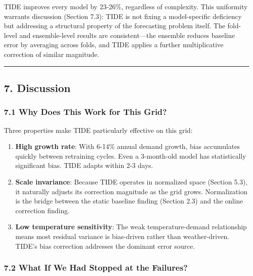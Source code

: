 TIDE improves every model by 23-26\%, regardless of complexity. This
uniformity warrants discussion (Section 7.3): TIDE is not fixing a
model-specific deficiency but addressing a structural property of the
forecasting problem itself. The fold-level and ensemble-level results
are consistent---the ensemble reduces baseline error by averaging across
folds, and TIDE applies a further multiplicative correction of similar
magnitude.

\begin{center}\rule{0.5\linewidth}{0.5pt}\end{center}

\subsection{7. Discussion}\label{discussion}

\subsubsection{7.1 Why Does This Work for This
Grid?}\label{why-does-this-work-for-this-grid}

Three properties make TIDE particularly effective on this grid:

\begin{enumerate}
\def\labelenumi{\arabic{enumi}.}
\item
  \textbf{High growth rate}: With 6-14\% annual demand growth, bias
  accumulates quickly between retraining cycles. Even a 3-month-old
  model has statistically significant bias. TIDE adapts within 2-3 days.
\item
  \textbf{Scale invariance}: Because TIDE operates in normalized space
  (Section 5.3), it naturally adjusts its correction magnitude as the
  grid grows. Normalization is the bridge between the static baseline
  finding (Section 2.3) and the online correction finding.
\item
  \textbf{Low temperature sensitivity}: The weak temperature-demand
  relationship means most residual variance is bias-driven rather than
  weather-driven. TIDE's bias correction addresses the dominant error
  source.
\end{enumerate}

\subsubsection{7.2 What If We Had Stopped at the
Failures?}\label{what-if-we-had-stopped-at-the-failures}

